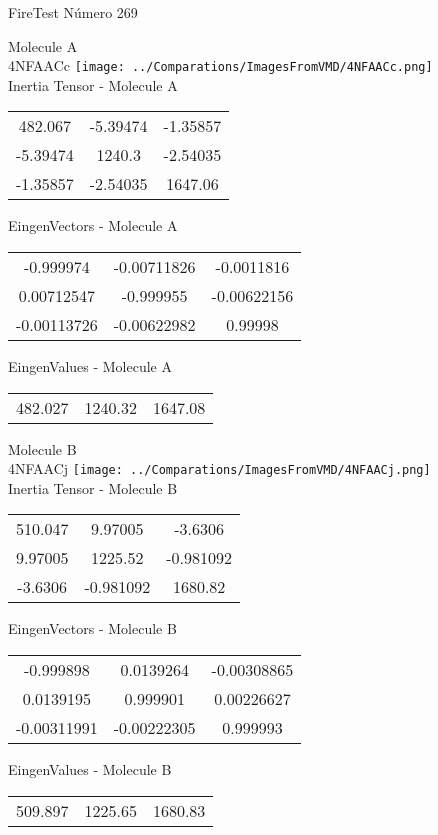 \vtab[-2cm]
\begin{center}
{\large FireTest \tab Número 269}
\end{center}
\begin{multicols}{2}
\begin{center}

Molecule A \\ 
4NFAACc
\texttt{[image: ../Comparations/ImagesFromVMD/4NFAACc.png]}
\\
Inertia Tensor - Molecule A \\
\vtab

\begin{tabular}{|c c c|}
482.067	 & 	-5.39474	 & 	-1.35857	 \\
-5.39474	 & 	1240.3	 & 	-2.54035	 \\
-1.35857	 & 	-2.54035	 & 	1647.06
\end{tabular}

\vtab
 EingenVectors - Molecule A     \\
\vtab
\begin{tabular}{|c c c|}
-0.999974	 & 	-0.00711826	 & 	-0.0011816	 \\
0.00712547	 & 	-0.999955	 & 	-0.00622156	 \\
-0.00113726	 & 	-0.00622982	 & 	0.99998
\end{tabular}

\vtab
 EingenValues - Molecule A     \\
\vtab
\begin{tabular}{|c c c|}
482.027	 & 	1240.32	 & 	1647.08	 \\
\end{tabular}
\columnbreak

Molecule B \\ 
4NFAACj
\texttt{[image: ../Comparations/ImagesFromVMD/4NFAACj.png]}
\\
Inertia Tensor - Molecule B \\
\vtab

\begin{tabular}{|c c c|}
510.047	 & 	9.97005	 & 	-3.6306	 \\
9.97005	 & 	1225.52	 & 	-0.981092	 \\
-3.6306	 & 	-0.981092	 & 	1680.82
\end{tabular}

\vtab
 EingenVectors - Molecule B     \\
\vtab
\begin{tabular}{|c c c|}
-0.999898	 & 	0.0139264	 & 	-0.00308865	 \\
0.0139195	 & 	0.999901	 & 	0.00226627	 \\
-0.00311991	 & 	-0.00222305	 & 	0.999993
\end{tabular}

\vtab
 EingenValues - Molecule B     \\
\vtab
\begin{tabular}{|c c c|}
509.897	 & 	1225.65	 & 	1680.83	 \\
\end{tabular}

\end{center}
\end{multicols}
